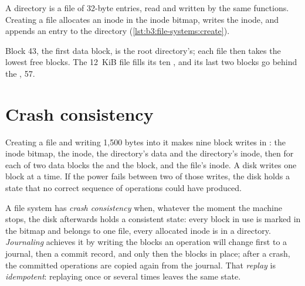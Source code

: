 \label{lst:b3:file-systems:write}

A directory is a file of 32-byte entries, read and written by the same functions. Creating a file allocates an inode in the inode bitmap, writes the inode, and appends an entry to the directory (\cref{lst:b3:file-systems:create}).

\label{lst:b3:file-systems:create}

\label{lst:b3:file-systems:demo}

\label{out:b3:file-systems:demo}

Block 43, the first data block, is the root directory's; each file then takes the lowest free blocks. The 12~KiB file fills its ten , and its last two blocks go behind the , 57.

\section{Crash consistency}\label{sec:b3:file-systems:crash}

Creating a file and writing 1,500 bytes into it makes nine block writes in : the inode bitmap, the inode, the directory's data and the directory's inode, then for each of two data blocks the  and the block, and the file's inode. A disk writes one block at a time. If the power fails between two of those writes, the disk holds a state that no correct sequence of operations could have produced.

\begin{definition}\label{def:b3:file-systems:consistency}
A file system has \emph{crash consistency} when, whatever the moment the machine stops, the disk afterwards holds a consistent state: every block in use is marked in the bitmap and belongs to one file, every allocated inode is in a directory. \emph{Journaling} achieves it by writing the blocks an operation will change first to a journal, then a commit record, and only then the blocks in place; after a crash, the committed operations are copied again from the journal. That \emph{replay} is \emph{idempotent}: replaying once or several times leaves the same state.
\end{definition}


